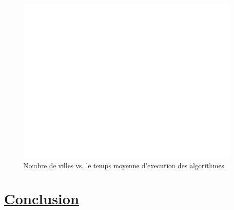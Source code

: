 \documentclass[a4paper,11pt,fleqn]{article}
\begin{document}
\begin{figure}[H]
    \centering
    \includegraphics[width=\textwidth]{images/complexite_temporelle.pdf}
    \caption{Nombre de villes vs. le temps moyenne d'execution des algorithmes.}
    \label{fig:temps}
\end{figure}

\newpage

\section*{\underline{Conclusion}}

\newpage


\end{document}
